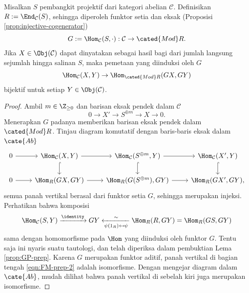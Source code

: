 \begin{lemma}\label{prop:FM-prep-2}
	Misalkan $S$ pembangkit projektif dari kategori abelian $\mathcal{C}$. Definisikan $R := \End_{\mathcal{C}}(S)$, sehingga diperoleh funktor setia dan eksak (Proposisi \ref{prop:injective-cogenerator})
	\[ G := \Hom_{\mathcal{C}}(S, \cdot): \mathcal{C} \to \cated{Mod}R. \]
	Jika $X \in \Obj(\mathcal{C})$ dapat dinyatakan sebagai hasil bagi dari jumlah langsung sejumlah hingga salinan $S$, maka pemetaan yang diinduksi oleh $G$
	\[ \Hom_{\mathcal{C}}(X, Y) \to \Hom_{\cated{Mod}R}(GX, GY) \]
	bijektif untuk setiap $Y \in \Obj(\mathcal{C})$.
\end{lemma}
\begin{proof}
	Ambil $m \in \Z_{\geq 0}$ dan barisan eksak pendek dalam $\mathcal{C}$
	\[ 0 \to X' \to S^{\oplus m} \to X \to 0. \]
	Menerapkan $G$ padanya memberikan barisan eksak pendek dalam $\cated{Mod}R$. Tinjau diagram komutatif dengan baris-baris eksak dalam $\cate{Ab}$
	\begin{equation}\label{eqn:FM-prep-2}\begin{tikzcd}
			0 \arrow[r] & \Hom_{\mathcal{C}}(X, Y) \arrow[r] \arrow[hookrightarrow, d] & \Hom_{\mathcal{C}}(S^{\oplus m}, Y) \arrow[r] \arrow[hookrightarrow, d] & \Hom_{\mathcal{C}}(X', Y) \arrow[hookrightarrow, d] \\
			0 \arrow[r] & \Hom_R(GX, GY) \arrow[r] & \Hom_R(G(S^{\oplus m}), GY) \arrow[r] & \Hom_R(GX', GY),
	\end{tikzcd}\end{equation}
	semua panah vertikal berasal dari funktor setia $G$, sehingga merupakan injeksi. Perhatikan bahwa komposisi
	\[ \Hom_{\mathcal{C}}(S, Y) \xrightarrow{\identity} GY \xleftarrow[\psi(1_R) \mapsfrom \psi]{\sim} \Hom_R(R, GY) = \Hom_R(GS, GY) \]
	sama dengan homomorfisme pada $\Hom$ yang diinduksi oleh funktor $G$. Tentu saja ini nyaris suatu tautologi, dan telah diperiksa dalam pembuktian Lema \ref{prop:GP-prep}. Karena $G$ merupakan funktor aditif, panah vertikal di bagian tengah \eqref{eqn:FM-prep-2} adalah isomorfisme. Dengan mengejar diagram dalam $\cate{Ab}$, mudah dilihat bahwa panah vertikal di sebelah kiri juga merupakan isomorfisme.
\end{proof}


